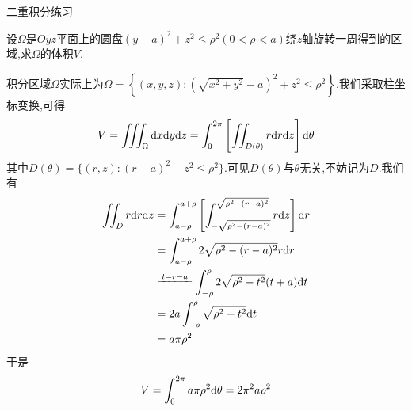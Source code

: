 \documentclass{ctexart}
\begin{document}
\pagestyle{empty}
\begin{center}\large 二重积分练习\end{center}
\begin{problem}[1.]
    设$\Omega$是$Oyz$平面上的圆盘$(y-a)^2+z^2\leqslant\rho^2\left(0<\rho<a\right)$绕$z$轴旋转一周得到的区域,求$\Omega$的体积$V$.
\end{problem}
\begin{solution}
    积分区域$\Omega$实际上为$\Omega=\left\{(x,y,z):\left(\sqrt{x^2+y^2}-a\right)^2+z^2\leqslant\rho^2\right\}$.我们采取柱坐标变换,可得
    \[V=\iiint_{\Omega}\mathrm{d} x\mathrm{d} y\mathrm{d} z=\int_{0}^{2\pi}\left[\iint_{D(\theta)}r\mathrm{d} r\mathrm{d} z\right]\mathrm{d}\theta\]
    其中$D(\theta)=\{(r,z):(r-a)^2+z^2\leqslant\rho^2\}$.可见$D(\theta)$与$\theta$无关,不妨记为$D$.我们有
    \[\begin{aligned}
        \iint_{D}r\di r\di z
        &= \int_{a-\rho}^{a+\rho}\left[\int_{-\sqrt{\rho^2-(r-a)^2}}^{\sqrt{\rho^2-(r-a)^2}}r\di z\right]\di r \\
        &= \int_{a-\rho}^{a+\rho}2\sqrt{\rho^2-(r-a)^2}r\di r \\
        &\xlongequal{t=r-a} \int_{-\rho}^{\rho}2\sqrt{\rho^2-t^2}(t+a)\di t \\
        &= 2a\int_{-\rho}^{\rho}\sqrt{\rho^2-t^2}\di t \\
        &= a\pi\rho^2
    \end{aligned}\]
    于是
    \[V=\int_{0}^{2\pi}a\pi\rho^2\mathrm{d}\theta=2\pi^2a\rho^2\]
\end{solution}
\end{document}
